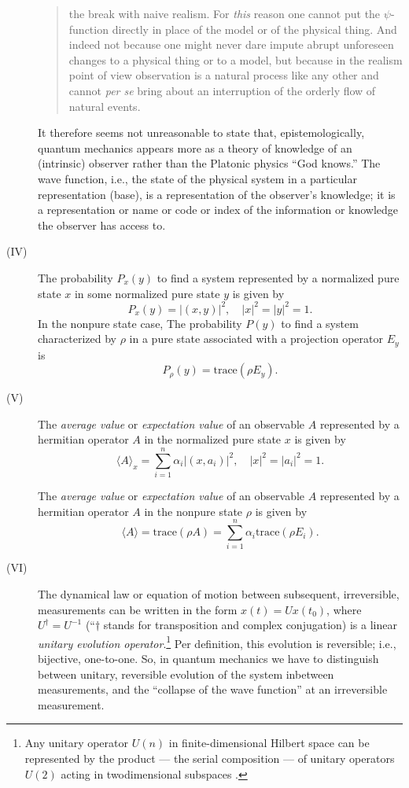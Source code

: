 \documentclass [11pt]{llncs}
\begin{document}
\begin{description}
\begin{quote}
the break with naive realism. For {\em this} reason one cannot put the
$\psi$-function directly in place of the model or of the physical thing.
And indeed not because one might never dare impute abrupt unforeseen
changes to a physical thing or to a model, but because in the realism
point of view observation is a natural process like any other and cannot
{\em per se} bring about an interruption of the orderly flow of natural
events.
\end{quote}
It therefore seems not unreasonable to state that, epistemologically,
quantum mechanics appears more as a theory of knowledge of an
(intrinsic) observer rather than the Platonic physics ``God knows.''
The  wave function, i.e., the state of the physical system in a
particular
representation (base), is a representation of the observer's knowledge;
it is a representation or name or code or index of
the information or knowledge the observer has access to.


\item[(IV)]
The probability $P_x(y)$ to find a system represented by a  normalized
pure state
$x$ in some normalized pure state $y$ is
given by
$$P_x(y)=\vert (x,y) \vert^2 , \quad \vert x\vert^2=\vert y\vert^2=1.$$
In the nonpure state case, The probability $P(y)$ to find a system
characterized by $\rho$
in a pure state associated with a projection operator
$E_y$ is
$$P_\rho (y)=\textrm{trace}(\rho E_y).$$


\item[(V)]
The {\em average value} or {\em expectation value} of an observable
${A}$
represented by a hermitian operator
$A$ in the normalized pure state
$ x$
is given by
$$\langle A\rangle_ x =
\sum_{i=1}^n \alpha_i
\vert (x,a_i) \vert^2, \quad \vert x\vert^2=\vert a_i\vert^2=1.$$

The {\em average value} or {\em expectation value} of an observable
${A}$
represented by a hermitian operator
$A$ in the nonpure state
$\rho$
is given by
$$\langle A\rangle =\textrm{trace}(\rho A)
=\sum_{i=1}^n \alpha_i\textrm{trace}(\rho E_i)
.$$

\item[(VI)]
The dynamical law or equation of motion between subsequent, irreversible,
measurements can be written in the form
$x (t) =Ux (t_0) $,
where $U^\dagger =U^{-1}$ (``$\dagger $ stands for transposition and
complex conjugation) is a
linear {\em unitary evolution operator}.\footnote{
Any unitary operator $U(n)$ in finite-dimensional Hilbert space can be
represented by the product --- the serial composition --- of unitary
operators  $U(2)$ acting in twodimensional subspaces
\cite{murnaghan,rzbb}.}
Per definition, this evolution is reversible; i.e., bijective,
one-to-one.
So, in quantum mechanics we have to distinguish between unitary,
reversible evolution of the system inbetween measurements, and the
``collapse of the wave function'' at an irreversible measurement.



\end{description}
\end{document}
